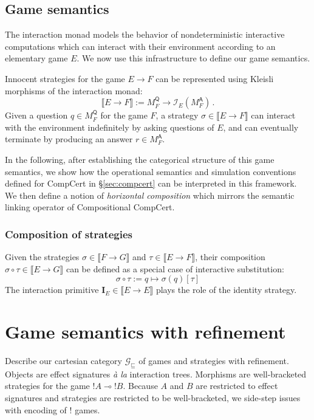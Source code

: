 \documentclass[format=sigplan,authordraft]{acmart}
\newcommand{\gcat}{\mathcal{G}_{\sqsubseteq}}
\newcommand{\kw}[1]{\ensuremath{ \mathsf{#1} }}
\begin{document}

\subsection{Game semantics}

The interaction monad
models the behavior of
nondeterministic interactive computations
which can interact with their environment
according to an elementary game $E$.
We now use this infrastructure
to define our game semantics.

Innocent strategies for the game $E \rightarrow F$
can be represented using Kleisli morphisms of
the interaction monad:
\[
  \llbracket E \rightarrow F \rrbracket :=
  M_F^\kw{Q} \rightarrow \mathcal{I}_E(M_F^\kw{A}) \,.
\]
Given a question $q \in M_F^\kw{Q}$ for the game $F$,
a strategy $\sigma \in \llbracket E \rightarrow F \rrbracket$
can interact with the environment
indefinitely by asking questions of $E$,
and can eventually terminate by producing an answer $r \in M_F^\kw{A}$.

In the following,
after establishing the categorical structure
of this game semantics,
we show how
the operational semantics
and simulation conventions
defined for CompCert in \S\ref{sec:compcert}
can be interpreted in this framework.
We then define a notion of \emph{horizontal composition}
which mirrors the semantic linking operator
of Compositional CompCert.

\subsubsection{Composition of strategies}

Given the strategies
$\sigma \in \llbracket F \rightarrow G \rrbracket$ and
$\tau \in \llbracket E \rightarrow F \rrbracket$,
their composition
$\sigma \circ \tau \in \llbracket E \rightarrow G \rrbracket$
can be defined as a special case of interactive substitution:
\[
    \sigma \circ \tau := q \mapsto \sigma(q)[\tau]
\]
The interaction primitive
$\mathbf{I}_E \in \llbracket E \rightarrow E \rrbracket$
plays the role of the identity strategy.


\section{Game semantics with refinement} %

Describe our cartesian category $\gcat$
of games and strategies with refinement.
Objects are effect signatures \emph{\`a la} interaction trees.
Morphisms are well-bracketed strategies for
the game ${!A} \multimap {!B}$.
Because $A$ and $B$ are restricted to effect signatures and
strategies are restricted to be well-bracketed,
we side-step issues with encoding of $!$ games.
\end{document}
